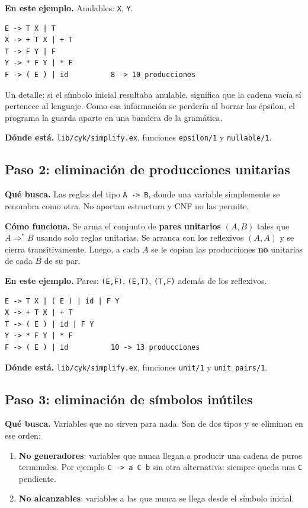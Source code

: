\documentclass[11pt,a4paper]{article}
\newcommand{\gram}[1]{\texttt{#1}}
\begin{document}
\textbf{En este ejemplo.} Anulables: \gram{X}, \gram{Y}.

\begin{lstlisting}
E -> T X | T
X -> + T X | + T
T -> F Y | F
Y -> * F Y | * F
F -> ( E ) | id          8 -> 10 producciones
\end{lstlisting}

Un detalle: si el símbolo inicial resultaba anulable, significa que la cadena
vacía sí pertenece al lenguaje. Como esa información se perdería al borrar las
épsilon, el programa la guarda aparte en una bandera de la gramática.

\textbf{Dónde está.} \texttt{lib/cyk/simplify.ex}, funciones
\texttt{epsilon/1} y \texttt{nullable/1}.

\subsection{Paso 2: eliminación de producciones unitarias}

\textbf{Qué busca.} Las reglas del tipo \gram{A -> B}, donde una variable
simplemente se renombra como otra. No aportan estructura y CNF no las permite.

\textbf{Cómo funciona.} Se arma el conjunto de \textbf{pares unitarios}
$(A, B)$ tales que $A \Rightarrow^* B$ usando solo reglas unitarias. Se
arranca con los reflexivos $(A, A)$ y se cierra transitivamente. Luego, a cada
$A$ se le copian las producciones \textbf{no} unitarias de cada $B$ de su par.

\textbf{En este ejemplo.} Pares: \gram{(E,F)}, \gram{(E,T)}, \gram{(T,F)}
además de los reflexivos.

\begin{lstlisting}
E -> T X | ( E ) | id | F Y
X -> + T X | + T
T -> ( E ) | id | F Y
Y -> * F Y | * F
F -> ( E ) | id          10 -> 13 producciones
\end{lstlisting}

\textbf{Dónde está.} \texttt{lib/cyk/simplify.ex}, funciones
\texttt{unit/1} y \texttt{unit\_pairs/1}.

\subsection{Paso 3: eliminación de símbolos inútiles}

\textbf{Qué busca.} Variables que no sirven para nada. Son de dos tipos y se
eliminan en ese orden:

\begin{enumerate}[leftmargin=*]
  \item \textbf{No generadores}: variables que nunca llegan a producir una
  cadena de puros terminales. Por ejemplo \gram{C -> a C b} sin otra
  alternativa: siempre queda una \gram{C} pendiente.
  \item \textbf{No alcanzables}: variables a las que nunca se llega desde el
  símbolo inicial.
\end{enumerate}
\end{document}
